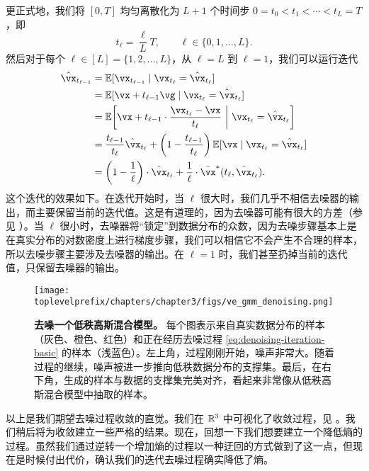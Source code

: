 \documentclass[../../book-main_zh.tex]{subfiles}
\begin{document}
更正式地，我们将 \([0, T]\) 均匀离散化为 \(L + 1\) 个时间步 \(0 = t_{0} < t_{1} < \cdots < t_{L} = T\)，即
\begin{equation}
	t_{\ell} = \frac{\ell}{L}T, \qquad \ell \in \{0, 1, \dots, L\}.
\end{equation}
然后对于每个 \(\ell \in [L] = \{1, 2, \dots, L\}\)，从 \(\ell = L\) 到 \(\ell = 1\)，我们可以运行迭代
\begin{align}
	\hat{\vx}_{t_{\ell - 1}}
	&= \Ex[\vx_{t_{\ell - 1}} \mid \vx_{t_{\ell}} = \hat{\vx}_{t_{\ell}}] \\
	&= \Ex[\vx + t_{\ell - 1}\vg \mid \vx_{t_{\ell}} = \hat{\vx}_{t_{\ell}}] \\
	&= \Ex\rs{\vx + t_{\ell - 1}\cdot\frac{\vx_{t_{\ell}} - \vx}{t_{\ell}} \given \vx_{t_{\ell}} = \hat{\vx}_{t_{\ell}}} \\
	&= \frac{t_{\ell - 1}}{t_{\ell}}\hat{\vx}_{t_{\ell}} + \bp{1 - \frac{t_{\ell - 1}}{t_{\ell}}}\Ex[\vx \mid \vx_{t_{\ell}} = \hat{\vx}_{t_{\ell}}] \\
	&= \bp{1 - \frac{1}{\ell}}\cdot\hat{\vx}_{t_{\ell}} + \frac{1}{\ell}\cdot\bar{\vx}^{\ast}(t_{\ell}, \hat{\vx}_{t_{\ell}}).
\end{align}
这个迭代的效果如下。在迭代开始时，当 \(\ell\) 很大时，我们几乎不相信去噪器的输出，而主要保留当前的迭代值。这是有道理的，因为去噪器可能有很大的方差（参见 ）。当 \(\ell\) 很小时，去噪器将“锁定”到数据分布的众数，因为去噪步骤基本上是在真实分布的对数密度上进行梯度步骤，我们可以相信它不会产生不合理的样本，所以去噪步骤主要涉及去噪器的输出。在 \(\ell = 1\) 时，我们甚至扔掉当前的迭代值，只保留去噪器的输出。

\begin{figure}[t]
	\centering
	\texttt{[image: \\toplevelprefix/chapters/chapter3/figs/ve\_gmm\_denoising.png]}
	\caption{\small\textbf{去噪一个低秩高斯混合模型。} 每个图表示来自真实数据分布的样本（灰色、橙色、红色）和正在经历去噪过程 \eqref{eq:denoising-iteration-basic} 的样本（浅蓝色）。左上角，过程刚刚开始，噪声非常大。随着过程的继续，噪声被进一步推向低秩数据分布的支撑集。最后，在右下角，生成的样本与数据的支撑集完美对齐，看起来非常像从低秩高斯混合模型中抽取的样本。}
	\label{fig:ve_gmm_denoising}
\end{figure}

以上是我们期望去噪过程收敛的直觉。我们在 \(\mathbb{R}^{3}\) 中可视化了收敛过程，见 。我们稍后将为收敛建立一些严格的结果。现在，回想一下我们想要建立一个降低熵的过程。虽然我们通过逆转一个增加熵的过程以一种迂回的方式做到了这一点，但现在是时候付出代价，确认我们的迭代去噪过程确实降低了熵。
\end{document}
